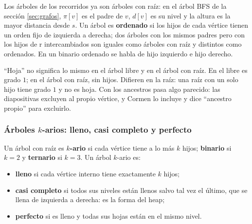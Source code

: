 \documentclass[11pt,letterpaper]{article}
\begin{document}
Los árboles de los recorridos ya son árboles con raíz: en el árbol BFS
de la sección \ref{sec:grafos}, $\pi[v]$ es el padre de $v$, $d[v]$ es
su nivel y la altura es la mayor distancia desde $s$. Un árbol es
\textbf{ordenado} si los hijos de cada vértice tienen un orden fijo
de izquierda a derecha; dos árboles con los mismos padres pero con los
hijos de r intercambiados son iguales como árboles con raíz y
distintos como ordenados. En un binario ordenado se habla de hijo
izquierdo e hijo derecho.

\begin{ojo}
  ``Hoja'' no significa lo mismo en el árbol libre y en el árbol con
  raíz. En el libre es grado $1$; en el árbol con raíz, sin hijos.
  Difieren en la raíz: una raíz con un solo hijo tiene grado $1$ y no
  es hoja. Con los ancestros pasa algo parecido: las diapositivas
  excluyen al propio vértice, y Cormen lo incluye y dice ``ancestro
  propio'' para excluirlo.
\end{ojo}

\subsubsection*{Árboles $k$-arios: lleno, casi completo y perfecto}

\begin{definicion}
  \label{def:arbol-kario}
  Un árbol con raíz es \textbf{$k$-ario} si cada vértice tiene a lo más
  $k$ hijos; \textbf{binario} si $k = 2$ y \textbf{ternario} si
  $k = 3$. Un árbol $k$-ario es:
  \begin{itemize}[itemsep=0.1em]
    \item \textbf{lleno} si cada vértice interno tiene exactamente $k$
          hijos;
    \item \textbf{casi completo} si todos sus niveles están llenos
          salvo tal vez el último, que se llena de izquierda a
          derecha: es la forma del heap;
    \item \textbf{perfecto} si es lleno y todas sus hojas están en el
          mismo nivel.
  \end{itemize}
\end{definicion}
\end{document}

